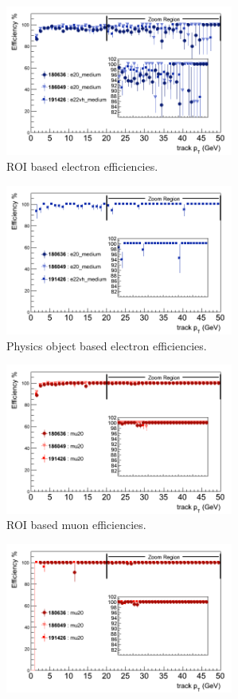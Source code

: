\begin{figure}[htbp]
	\begin{subfigure}{.5\linewidth}
		\centering
		\includegraphics[width=75mm]{f/e20_medium_IDTrkNoCut_pT_EF_eff}
		\caption{ROI based electron efficiencies.}
		\label{fig:trig_2011_EF_pt_a}
	\end{subfigure}
	\begin{subfigure}{.5\linewidth}	
		\centering
		\includegraphics[width=75mm]{f/e20_medium_IDTrkNoCut_pT_EF_eff_comb}
		\caption{Physics object based electron efficiencies.}
		\label{fig:trig_2011_EF_pt_b}
	\end{subfigure}
	\begin{subfigure}{.5\linewidth}	
		\centering
		\includegraphics[width=75mm]{f/mu20_IDTrkNoCut_pT_EF_eff}
		\caption{ROI based muon efficiencies.}
		\label{fig:trig_2011_EF_pt_c}
	\end{subfigure}
	\begin{subfigure}{.5\linewidth}	
		\centering
		\includegraphics[width=75mm]{f/mu20_IDTrkNoCut_pT_EF_eff_comb}

\end{subfigure}
\end{figure}
